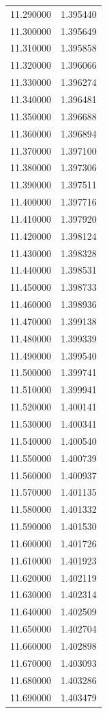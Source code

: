 \begin{tabular}{rr}
11.290000 & 1.395440 \\
11.300000 & 1.395649 \\
11.310000 & 1.395858 \\
11.320000 & 1.396066 \\
11.330000 & 1.396274 \\
11.340000 & 1.396481 \\
11.350000 & 1.396688 \\
11.360000 & 1.396894 \\
11.370000 & 1.397100 \\
11.380000 & 1.397306 \\
11.390000 & 1.397511 \\
11.400000 & 1.397716 \\
11.410000 & 1.397920 \\
11.420000 & 1.398124 \\
11.430000 & 1.398328 \\
11.440000 & 1.398531 \\
11.450000 & 1.398733 \\
11.460000 & 1.398936 \\
11.470000 & 1.399138 \\
11.480000 & 1.399339 \\
11.490000 & 1.399540 \\
11.500000 & 1.399741 \\
11.510000 & 1.399941 \\
11.520000 & 1.400141 \\
11.530000 & 1.400341 \\
11.540000 & 1.400540 \\
11.550000 & 1.400739 \\
11.560000 & 1.400937 \\
11.570000 & 1.401135 \\
11.580000 & 1.401332 \\
11.590000 & 1.401530 \\
11.600000 & 1.401726 \\
11.610000 & 1.401923 \\
11.620000 & 1.402119 \\
11.630000 & 1.402314 \\
11.640000 & 1.402509 \\
11.650000 & 1.402704 \\
11.660000 & 1.402898 \\
11.670000 & 1.403093 \\
11.680000 & 1.403286 \\
11.690000 & 1.403479 \\

\end{tabular}

